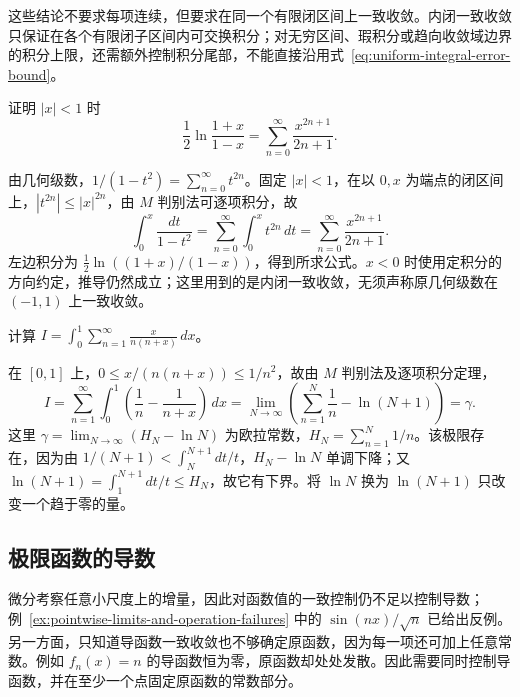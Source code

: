 这些结论不要求每项连续，但要求在同一个有限闭区间上一致收敛。内闭一致收敛只保证在各个有限闭子区间内可交换积分；对无穷区间、瑕积分或趋向收敛域边界的积分上限，还需额外控制积分尾部，不能直接沿用式~\eqref{eq:uniform-integral-error-bound}。

\begin{example}
\label{ex:logarithm-series-by-termwise-integration}
证明 $|x|<1$ 时
\begin{equation}
    \frac12\ln\frac{1+x}{1-x}
       =\sum_{n=0}^\infty\frac{x^{2n+1}}{2n+1}.
    \label{eq:logarithm-odd-power-series}
\end{equation}
\end{example}

\begin{solve}
由几何级数，$1/(1-t^2)=\sum_{n=0}^\infty t^{2n}$。固定 $|x|<1$，在以 $0,x$ 为端点的闭区间上，$|t^{2n}|\leq|x|^{2n}$，由 $M$ 判别法可逐项积分，故
\[
    \int_0^x\frac{dt}{1-t^2}
       =\sum_{n=0}^\infty\int_0^xt^{2n}\,dt
       =\sum_{n=0}^\infty\frac{x^{2n+1}}{2n+1}.
\]
左边积分为 $\frac12\ln((1+x)/(1-x))$，得到所求公式。$x<0$ 时使用定积分的方向约定，推导仍然成立；这里用到的是内闭一致收敛，无须声称原几何级数在 $(-1,1)$ 上一致收敛。
\end{solve}

\begin{example}
\label{ex:euler-constant-integral-series}
计算 $\displaystyle I=\int_0^1\sum_{n=1}^\infty\frac{x}{n(n+x)}\,dx$。
\end{example}

\begin{solve}
在 $[0,1]$ 上，$0\leq x/(n(n+x))\leq1/n^2$，故由 $M$ 判别法及逐项积分定理，
\[
    I=\sum_{n=1}^\infty\int_0^1
          \left(\frac1n-\frac1{n+x}\right)\,dx
      =\lim_{N\to\infty}\left(\sum_{n=1}^N\frac1n-\ln(N+1)\right)
      =\gamma.
\]
这里 $\gamma=\lim_{N\to\infty}(H_N-\ln N)$ 为欧拉常数，$H_N=\sum_{n=1}^N1/n$。该极限存在，因为由 $1/(N+1)<\int_N^{N+1}dt/t$，$H_N-\ln N$ 单调下降；又 $\ln(N+1)=\int_1^{N+1}dt/t\leq H_N$，故它有下界。将 $\ln N$ 换为 $\ln(N+1)$ 只改变一个趋于零的量。
\end{solve}

\subsection{极限函数的导数}
\label{subsec:derivatives-of-limit-functions}

微分考察任意小尺度上的增量，因此对函数值的一致控制仍不足以控制导数；例~\ref{ex:pointwise-limits-and-operation-failures} 中的 $\sin(nx)/\sqrt n$ 已给出反例。另一方面，只知道导函数一致收敛也不够确定原函数，因为每一项还可加上任意常数。例如 $f_n(x)=n$ 的导函数恒为零，原函数却处处发散。因此需要同时控制导函数，并在至少一个点固定原函数的常数部分。

